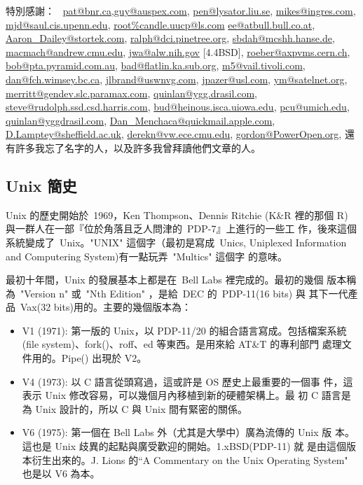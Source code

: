 \documentclass{article}
\begin{document}
\begin{CJK*}{Bg5}{ming}
    特別感謝：
    ~\url{pat@bnr.ca,guy@auspex.com}, \url{pen@lysator.liu.se}, 
    \url{mikes@ingres.com}, \url{mjd@saul.cis.upenn.edu}, 
    \url{root%candle.uucp@ls.com}
    \url{ee@atbull.bull.co.at}, \url{Aaron_Dailey@stortek.com}, 
    \url{ralph@dci.pinetree.org},
    \url{sbdah@mcshh.hanse.de}, \url{macmach@andrew.cmu.edu}, 
    \url{jwa@alw.nih.gov} [4.4BSD],
    \url{roeber@axpvms.cern.ch}, \url{bob@pta.pyramid.com.au},
    \url{bad@flatlin.ka.sub.org}, 
    \url{m5@vail.tivoli.com}, \url{dan@fch.wimsey.bc.ca}, 
    \url{jlbrand@uswnvg.com},
    \url{jpazer@usl.com},
    \url{ym@satelnet.org},
    \url{merritt@gendev.slc.paramax.com},
    \url{quinlan@ygg.drasil.com},
    \url{steve@rudolph.ssd.csd.harris.com},
    \url{bud@heinous.isca.uiowa.edu}, \url{pcu@umich.edu}, 
    \url{quinlan@yggdrasil.com},
    \url{Dan_Menchaca@quickmail.apple.com},
    \url{D.Lamptey@sheffield.ac.uk}, 
    \url{derekn@vw.ece.cmu.edu}, \url{gordon@PowerOpen.org}, 
    還有許多我忘了名字的人，以及許多我曾拜讀他們文章的人。


\subsection{Unix 簡史}

    Unix 的歷史開始於~1969，Ken Thompson、Dennis Ritchie (K\&R 裡的那個 
    R) 與一群人在一部『位於角落且乏人問津的~PDP-7』上進行的一些工
    作，後來這個系統變成了~Unix。"UNIX" 這個字（最初是寫成~Unics, 
    Uniplexed Information and Computering System)有一點玩弄~"Multics" 這個字
    的意味。

    最初十年間，Unix 的發展基本上都是在~Bell Labs 裡完成的。最初的幾個
    版本稱為~"Version n" 或~"Nth Edition" ，是給~DEC 的~PDP-11(16 bits) 與
    其下一代產品~Vax(32 bits)用的。主要的幾個版本為：
\begin{itemize}
    \item V1 (1971):  第一版的 Unix，以 PDP-11/20 的組合語言寫成。包括檔案系統
        (file system)、fork()、roff、ed 等東西。是用來給 AT\&T 的專利部門
        處理文件用的。Pipe() 出現於 V2。
      
    \item V4 (1973):  以 C 語言從頭寫過，這或許是 OS 歷史上最重要的一個事
        件，這表示 Unix 修改容易，可以幾個月內移植到新的硬體架構上。最
        初 C 語言是為 Unix 設計的，所以 C 與 Unix 間有緊密的關係。

    \item V6 (1975):  第一個在 Bell Labs 外（尤其是大學中）廣為流傳的 Unix 版
        本。這也是 Unix 歧異的起點與廣受歡迎的開始。1.xBSD(PDP-11) 就
        是由這個版本衍生出來的。J. Lions 的“A Commentary on the Unix 
        Operating System" 也是以 V6 為本。


\end{itemize}
\end{CJK*}
\end{document}
